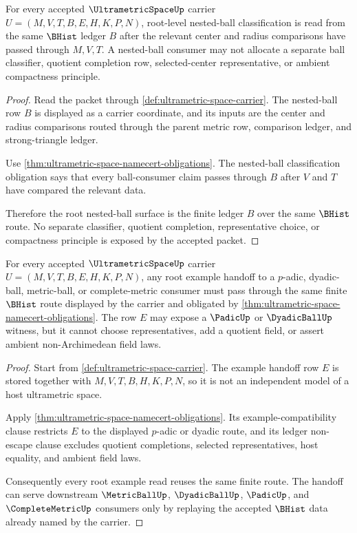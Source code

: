 \begin{theorem}
\label{thm:ultrametric-space-root-nested-ball-ledger}
For every accepted $\UltrametricSpaceUp$ carrier $U=(M,V,T,B,E,H,K,P,N)$, root-level nested-ball classification is read from the same $\BHist$ ledger $B$ after the relevant center and radius comparisons have passed through $M,V,T$. A nested-ball consumer may not allocate a separate ball classifier, quotient completion row, selected-center representative, or ambient compactness principle.
\end{theorem}
\begin{proof}
Read the packet through \autoref{def:ultrametric-space-carrier}. The nested-ball row $B$ is displayed as a carrier coordinate, and its inputs are the center and radius comparisons routed through the parent metric row, comparison ledger, and strong-triangle ledger.

Use \autoref{thm:ultrametric-space-namecert-obligations}. The nested-ball classification obligation says that every ball-consumer claim passes through $B$ after $V$ and $T$ have compared the relevant data.

Therefore the root nested-ball surface is the finite ledger $B$ over the same $\BHist$ route. No separate classifier, quotient completion, representative choice, or compactness principle is exposed by the accepted packet.
\end{proof}

\begin{theorem}
\label{thm:ultrametric-space-root-example-handoff}
For every accepted $\UltrametricSpaceUp$ carrier $U=(M,V,T,B,E,H,K,P,N)$, any root example handoff to a $p$-adic, dyadic-ball, metric-ball, or complete-metric consumer must pass through the same finite $\BHist$ route displayed by the carrier and obligated by \autoref{thm:ultrametric-space-namecert-obligations}. The row $E$ may expose a $\PadicUp$ or $\DyadicBallUp$ witness, but it cannot choose representatives, add a quotient field, or assert ambient non-Archimedean field laws.
\end{theorem}
\begin{proof}
Start from \autoref{def:ultrametric-space-carrier}. The example handoff row $E$ is stored together with $M,V,T,B,H,K,P,N$, so it is not an independent model of a host ultrametric space.

Apply \autoref{thm:ultrametric-space-namecert-obligations}. Its example-compatibility clause restricts $E$ to the displayed $p$-adic or dyadic route, and its ledger non-escape clause excludes quotient completions, selected representatives, host equality, and ambient field laws.

Consequently every root example read reuses the same finite route. The handoff can serve downstream $\MetricBallUp$, $\DyadicBallUp$, $\PadicUp$, and $\CompleteMetricUp$ consumers only by replaying the accepted $\BHist$ data already named by the carrier.
\end{proof}

